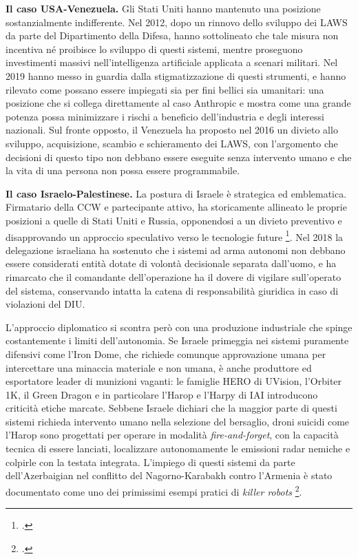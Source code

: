 \documentclass[a4paper,12pt]{report}
\begin{document}
\textbf{Il caso USA-Venezuela.}
Gli Stati Uniti hanno mantenuto una posizione sostanzialmente indifferente. Nel
2012, dopo un rinnovo dello sviluppo dei LAWS da parte del Dipartimento della
Difesa, hanno sottolineato che tale misura non incentiva né proibisce lo
sviluppo di questi sistemi, mentre proseguono investimenti massivi
nell'intelligenza artificiale applicata a scenari militari. Nel 2019 hanno messo
in guardia dalla stigmatizzazione di questi strumenti, e hanno rilevato come
possano essere impiegati sia per fini bellici sia umanitari: una posizione che
si collega direttamente al caso Anthropic e mostra come una grande potenza possa
minimizzare i rischi a beneficio dell'industria e degli interessi nazionali. Sul
fronte opposto, il Venezuela ha proposto nel 2016 un divieto allo sviluppo,
acquisizione, scambio e schieramento dei LAWS, con l'argomento che decisioni di
questo tipo non debbano essere eseguite senza intervento umano e che la vita di
una persona non possa essere programmabile.
 
\textbf{Il caso Israelo-Palestinese.}
La postura di Israele è strategica ed emblematica. Firmatario della CCW e
partecipante attivo, ha storicamente allineato le proprie posizioni a quelle di
Stati Uniti e Russia, opponendosi a un divieto preventivo e disapprovando un
approccio speculativo verso le tecnologie future \footcite{antebi_2018}. Nel
2018 la delegazione israeliana ha sostenuto che i sistemi ad arma autonomi non
debbano essere considerati entità dotate di volontà decisionale separata
dall'uomo, e ha rimarcato che il comandante dell'operazione ha il dovere di
vigilare sull'operato del sistema, conservando intatta la catena di
responsabilità giuridica in caso di violazioni del DIU.
 
L'approccio diplomatico si scontra però con una produzione industriale che
spinge costantemente i limiti dell'autonomia. Se Israele primeggia nei sistemi
puramente difensivi come l'Iron Dome, che richiede comunque approvazione umana
per intercettare una minaccia materiale e non umana, è anche produttore ed
esportatore leader di munizioni vaganti: le famiglie HERO di UVision, l'Orbiter
1K, il Green Dragon e in particolare l'Harop e l'Harpy di IAI introducono
criticità etiche marcate. Sebbene Israele dichiari che la maggior parte di
questi sistemi richieda intervento umano nella selezione del bersaglio, droni
suicidi come l'Harop sono progettati per operare in modalità
\textit{fire-and-forget}, con la capacità tecnica di essere lanciati,
localizzare autonomamente le emissioni radar nemiche e colpirle con la testata
integrata. L'impiego di questi sistemi da parte dell'Azerbaigian nel conflitto
del Nagorno-Karabakh contro l'Armenia è stato documentato come uno dei
primissimi esempi pratici di \textit{killer robots} \footcite{antebi_2018}.
 
\end{document}
